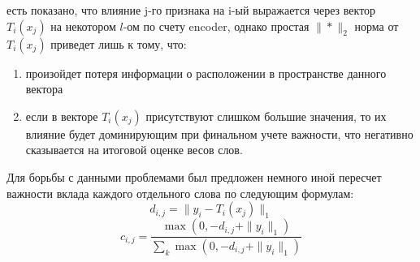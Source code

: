  есть показано, что влияние j-го признака на i-ый выражается через вектор
$T_i(x_j)$ на некотором $l$-ом по счету encoder, однако простая $\|*\|_2$ норма от
$T_i(x_j)$ приведет лишь к тому, что: 
\begin{enumerate}
    \item произойдет потеря информации о расположении в пространстве данного вектора
    \item если в векторе $T_i(x_j)$ присутствуют слишком большие значения, то их влияние будет доминирующим при финальном учете важности, что негативно сказывается на итоговой оценке весов слов.
\end{enumerate}
Для борьбы с данными проблемами был предложен немного иной пересчет важности вклада каждого отдельного слова по следующим формулам:
\begin{equation*}
    d_{i,j} = \|y_i - T_i(x_j)\|_1
\end{equation*}
\begin{equation*}
    c_{i,j} = \frac{\max(0, -d_{i, j} + \|y_i\|_1)}{\sum_{k}\max(0, -d_{i, j} + \|y_i\|_1)}
\end{equation*}

